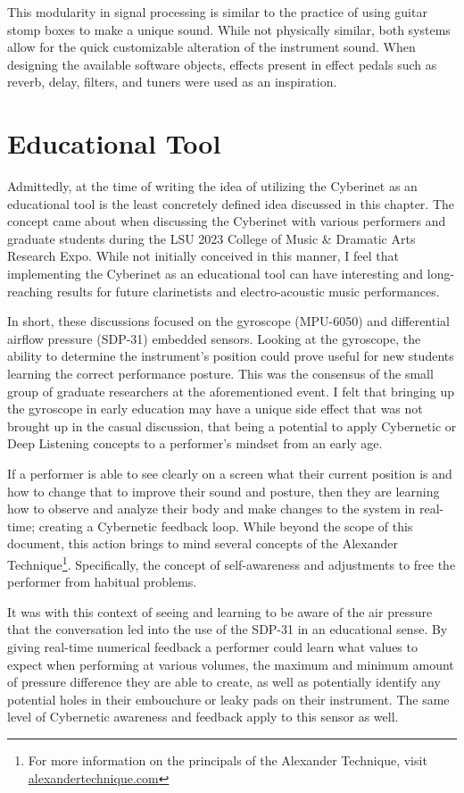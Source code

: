 This modularity in signal processing is similar to the practice of using guitar stomp boxes to make a unique sound. While not physically similar, both systems allow for the quick customizable alteration of the instrument sound. When designing the available software objects, effects present in effect pedals such as reverb, delay, filters, and tuners were used as an inspiration.

\section{Educational Tool}
Admittedly, at the time of writing the idea of utilizing the Cyberinet as an educational tool is the least concretely defined idea discussed in this chapter. The concept came about when discussing the Cyberinet with various performers and graduate students during the LSU 2023 College of Music \& Dramatic Arts Research Expo. While not initially conceived in this manner, I feel that implementing the Cyberinet as an educational tool can have interesting and long-reaching results for future clarinetists and electro-acoustic music performances. 

In short, these discussions focused on the gyroscope (MPU-6050) and differential airflow pressure (SDP-31) embedded sensors. Looking at the gyroscope, the ability to determine the instrument's position could prove useful for new students learning the correct performance posture. This was the consensus of the small group of graduate researchers at the aforementioned event. I felt that bringing up the gyroscope in early education may have a unique side effect that was not brought up in the casual discussion, that being a potential to apply Cybernetic or Deep Listening concepts to a performer's mindset from an early age.

If a performer is able to see clearly on a screen what their current position is and how to change that to improve their sound and posture, then they are learning how to observe and analyze their body and make changes to the system in real-time; creating a Cybernetic feedback loop.\cite{WeinerCybernetics2019} While beyond the scope of this document, this action brings to mind several concepts of the Alexander Technique\footnote{For more information on the principals of the Alexander Technique, visit \url{alexandertechnique.com}}. Specifically, the concept of self-awareness and adjustments to free the performer from habitual problems.\cite{gelbBodyLearning2013}

It was with this context of seeing and learning to be aware of the air pressure that the conversation led into the use of the SDP-31 in an educational sense. By giving real-time numerical feedback a performer could learn what values to expect when performing at various volumes, the maximum and minimum amount of pressure difference they are able to create, as well as potentially identify any potential holes in their embouchure or leaky pads on their instrument. The same level of Cybernetic awareness and feedback apply to this sensor as well.

